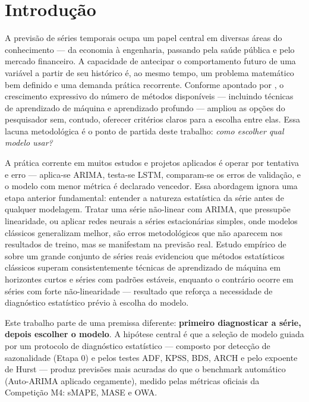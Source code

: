 \documentclass[
  12pt,
  openright,
  twoside,
  a4paper,
  english,
  brazil
]{abntex2}
\begin{document}
\frenchspacing

\imprimircapa

\imprimirfolhaderosto*

\tableofcontents*
\cleardoublepage

\chapter{Introdução}
\label{cap:introducao}

A previsão de séries temporais ocupa um papel central em diversas áreas do conhecimento — da economia à engenharia, passando pela saúde pública e pelo mercado financeiro. A capacidade de antecipar o comportamento futuro de uma variável a partir de seu histórico é, ao mesmo tempo, um problema matemático bem definido e uma demanda prática recorrente. Conforme apontado por , o crescimento expressivo do número de métodos disponíveis — incluindo técnicas de aprendizado de máquina e aprendizado profundo — ampliou as opções do pesquisador sem, contudo, oferecer critérios claros para a escolha entre elas. Essa lacuna metodológica é o ponto de partida deste trabalho: \textit{como escolher qual modelo usar?}

A prática corrente em muitos estudos e projetos aplicados é operar por tentativa e erro — aplica-se ARIMA, testa-se LSTM, comparam-se os erros de validação, e o modelo com menor métrica é declarado vencedor. Essa abordagem ignora uma etapa anterior fundamental: entender a natureza estatística da série antes de qualquer modelagem. Tratar uma série não-linear com ARIMA, que pressupõe linearidade, ou aplicar redes neurais a séries estacionárias simples, onde modelos clássicos generalizam melhor, são erros metodológicos que não aparecem nos resultados de treino, mas se manifestam na previsão real. Estudo empírico de  sobre um grande conjunto de séries reais evidenciou que métodos estatísticos clássicos superam consistentemente técnicas de aprendizado de máquina em horizontes curtos e séries com padrões estáveis, enquanto o contrário ocorre em séries com forte não-linearidade — resultado que reforça a necessidade de diagnóstico estatístico prévio à escolha do modelo.

Este trabalho parte de uma premissa diferente: \textbf{primeiro diagnosticar a série, depois escolher o modelo}. A hipótese central é que a seleção de modelo guiada por um protocolo de diagnóstico estatístico — composto por detecção de sazonalidade (Etapa 0) e pelos testes ADF, KPSS, BDS, ARCH e pelo expoente de Hurst — produz previsões mais acuradas do que o benchmark automático (Auto-ARIMA aplicado cegamente), medido pelas métricas oficiais da Competição M4: sMAPE, MASE e OWA.
\end{document}

